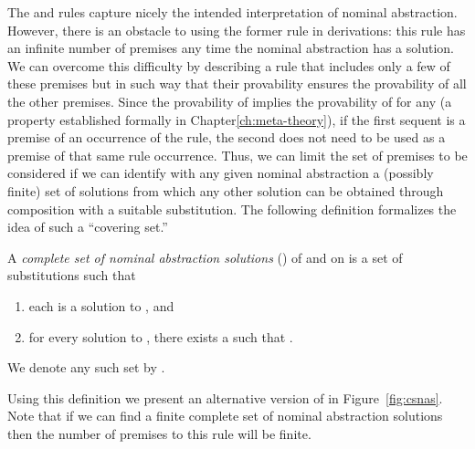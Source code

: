 The  and  rules capture nicely the intended
interpretation of nominal abstraction. However, there is an obstacle
to using the former rule in derivations: this rule has an infinite
number of premises any time the nominal abstraction  has a
solution. We can overcome this difficulty by describing a rule that
includes only a few of these premises but in such way that their
provability ensures the provability of all the other premises.  Since
the provability of  implies the provability of
 for any  (a property
established formally in Chapter\ref{ch:meta-theory}), if the first
sequent is a premise of an occurrence of the  rule, the
second does not need to be used as a premise of that same rule
occurrence.  Thus, we can limit the set of premises to be considered
if we can identify with any given nominal abstraction a (possibly
finite) set of solutions from which any other solution can be obtained
through composition with a suitable substitution. The following
definition formalizes the idea of such a ``covering set.''

\begin{definition}\label{csnas}
A {\em complete set of nominal abstraction solutions} (\CSNAS) of 
and  on 
is a set  of substitutions such
that
\begin{enumerate}
\item each  is a solution to , and
\item for every solution  to , there exists a
 such that .
\end{enumerate}
We denote any such set by .
\end{definition}
Using this definition we present an alternative version of 
in Figure~\ref{fig:csnas}. Note that if we can find a finite complete
set of nominal abstraction solutions then the number of premises to
this rule will be finite.


